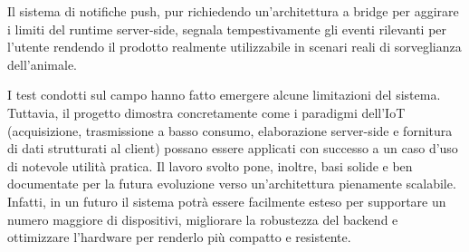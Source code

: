 \documentclass[12pt,a4paper]{article}
\begin{document}
Il sistema di notifiche push, pur richiedendo un'architettura a bridge per aggirare i limiti del runtime server-side, segnala tempestivamente gli eventi rilevanti per l'utente rendendo il prodotto realmente utilizzabile in scenari reali di sorveglianza dell'animale.

I test condotti sul campo hanno fatto emergere alcune limitazioni del sistema. Tuttavia, il progetto dimostra concretamente come i paradigmi dell'IoT (acquisizione, trasmissione a basso consumo, elaborazione server-side e fornitura di dati strutturati al client) possano essere applicati con successo a un caso d'uso di notevole utilità pratica. Il lavoro svolto pone, inoltre, basi solide e ben documentate per la futura evoluzione verso un'architettura pienamente scalabile. Infatti, in un futuro il sistema potrà essere facilmente esteso per supportare un numero maggiore di dispositivi, migliorare la robustezza del backend e ottimizzare l'hardware per renderlo più compatto e resistente.

\clearpage
{}
\printbibliography[title={Riferimenti bibliografici}]
\end{document}
